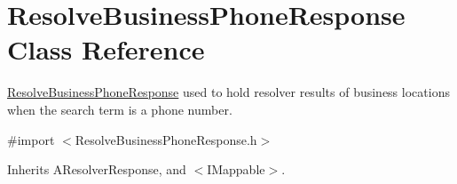 \hypertarget{interface_resolve_business_phone_response}{}\section{Resolve\+Business\+Phone\+Response Class Reference}
\label{interface_resolve_business_phone_response}


\hyperlink{interface_resolve_business_phone_response}{Resolve\+Business\+Phone\+Response} used to hold resolver results of business locations when the search term is a phone number.  




{\ttfamily \#import $<$Resolve\+Business\+Phone\+Response.\+h$>$}



Inherits A\+Resolver\+Response, and $<$\+I\+Mappable$>$.

